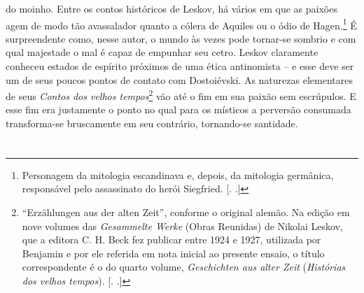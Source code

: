 do moinho. Entre os contos históricos de Leskov, há vários em que as
paixões agem de modo tão avassalador quanto a cólera de Aquiles ou o
ódio de Hagen.\footnote{Personagem da mitologia escandinava e, depois,
  da mitologia germânica, responsável pelo assassinato do herói
  Siegfried. [. .]} É surpreendente como, nesse autor, o mundo
às vezes pode tornar-se sombrio e com qual majestade o mal é capaz de
empunhar seu cetro. Leskov claramente conheceu estados de espírito
próximos de uma ética antinomista -- e esse deve ser um de seus poucos
pontos de contato com Dostoiévski. As naturezas elementares de seus
\emph{Contos dos velhos tempos}\footnote{``Erzählungen aus der alten
  Zeit'', conforme o original alemão. Na edição
  em nove volumes das \emph{Gesammelte Werke} (Obras Reunidas) de
  Nikolai Leskov, que a editora C. H. Beck fez publicar entre 1924 e
  1927, utilizada por Benjamin e por ele referida em nota inicial ao
  presente ensaio, o título correspondente é o do quarto
  volume, \emph{Geschichten aus alter Zeit} (\emph{Histórias dos velhos tempos}).
  [. .]} vão até o fim em sua paixão sem escrúpulos. E esse
fim era justamente o ponto no qual para os místicos a perversão
consumada transforma-se bruscamente em seu contrário, tornando-se
santidade.

\section{}

